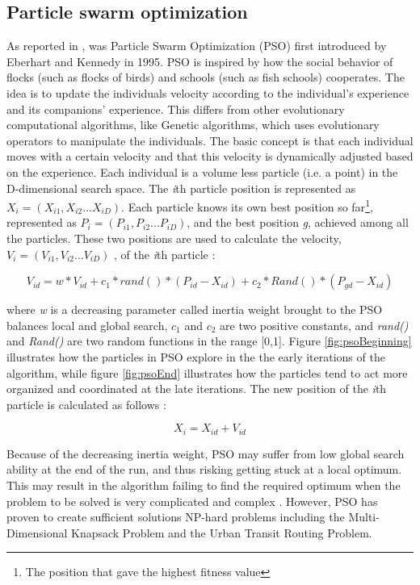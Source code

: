 \subsection{Particle swarm optimization}
\label{subsec:pso}
As reported in \citet{shi99}, was Particle Swarm Optimization (PSO) first introduced by Eberhart and Kennedy in 1995. PSO is inspired by how the social behavior of flocks (such as flocks of birds) and schools (such as fish schools) cooperates. The idea is to update the individuals velocity according to the individual's experience and its companions' experience. This differs from other evolutionary computational algorithms, like Genetic algorithms, which uses evolutionary operators to manipulate the individuals. The basic concept is that each individual moves with a certain velocity and that this velocity is dynamically adjusted based on the experience. Each individual is a volume less particle (i.e. a point) in the D-dimensional search space. The \textit{i}th particle position is represented as $X_i = (X_{i1},X_{i2}...X_{iD})$. Each particle knows its own best position so far\footnote{The position that gave the highest fitness value}, represented as $P_i = (P_{i1},P_{i2}...P_{iD})$, and the best position \textit{g}, achieved among all the particles. These two positions are used to calculate the velocity, $V_i = (V_{i1},V_{i2}...V_{iD})$ ,  of the \textit{i}th particle \citep{shi99}: 

$$V_{id} = w * V_{id} + c_1 * rand() * (P_{id}-X_{id}) + c_2 * Rand() * (P_{gd}-X_{id})$$

where \textit{w} is a decreasing parameter called inertia weight brought to the PSO balances local and global search, $c_1$ and $c_2$ are two positive constants, and \textit{rand()} and \textit{Rand()} are two random functions in the range [0,1]. Figure \ref{fig:psoBeginning} illustrates how the particles in PSO explore in the the early iterations of the algorithm, while figure \ref{fig:psoEnd} illustrates how the particles tend to act more organized and coordinated at the late iterations. The new position of the \textit{i}th particle is calculated as follows \cite{shi99}:

$$X_i = X_{id} + V_{id}$$

Because of the decreasing inertia weight, PSO may suffer from low global search ability at the end of the run, and thus risking getting stuck at a local optimum. This may result in the algorithm failing to find the required optimum when the problem to be solved is very complicated and complex \citep{shi99}. However, PSO has proven to create sufficient solutions NP-hard problems including the Multi-Dimensional Knapsack Problem \citep{wan09} and the Urban Transit Routing Problem\citep{kechagiopoulos14}. 

